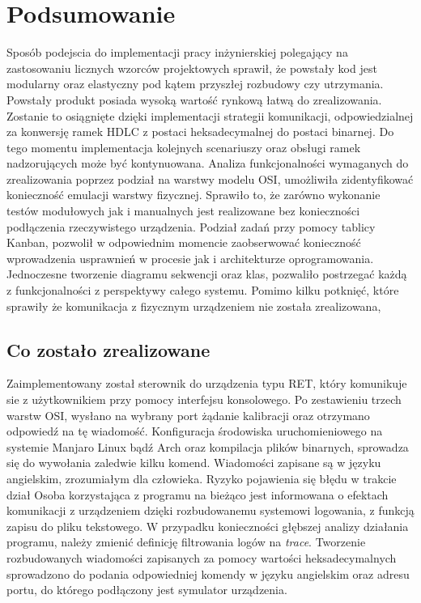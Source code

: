 \chapter{Podsumowanie}
    Sposób podejscia do implementacji pracy inżynierskiej polegający na zastosowaniu licznych wzorców projektowych sprawił, że powstały kod
    jest modularny oraz elastyczny pod kątem przyszłej rozbudowy czy utrzymania. Powstały produkt posiada wysoką wartość rynkową 
    łatwą do zrealizowania. Zostanie to osiągnięte dzięki implementacji strategii komunikacji, odpowiedzialnej za konwersję ramek HDLC z postaci heksadecymalnej
    do postaci binarnej. Do tego momentu implementacja kolejnych scenariuszy oraz obsługi ramek nadzorujących może być kontynuowana.
    Analiza funkcjonalności wymaganych do zrealizowania poprzez podział na warstwy modelu OSI, umożliwiła zidentyfikować konieczność emulacji warstwy fizycznej. 
    Sprawiło to, że zarówno wykonanie testów modułowych jak i manualnych jest realizowane bez konieczności podłączenia rzeczywistego urządzenia. 
    Podział zadań przy pomocy tablicy Kanban, pozwolił w odpowiednim momencie zaobserwować konieczność wprowadzenia usprawnień 
    w procesie jak i architekturze oprogramowania. Jednoczesne tworzenie diagramu sekwencji oraz klas, pozwaliło postrzegać każdą z funkcjonalności z perspektywy całego systemu.
    Pomimo kilku potknięć, które sprawiły że komunikacja z fizycznym urządzeniem nie została zrealizowana, 


    \section{Co zostało zrealizowane}
    Zaimplementowany został sterownik do urządzenia typu RET, który komunikuje sie z użytkownikiem przy pomocy interfejsu konsolowego. Po zestawieniu trzech 
    warstw OSI, wysłano na wybrany port żądanie kalibracji oraz otrzymano odpowiedź na tę wiadomość. Konfiguracja środowiska uruchomieniowego 
    na systemie Manjaro Linux bądź Arch oraz kompilacja plików binarnych, sprowadza się do wywołania zaledwie kilku komend. 
    Wiadomości zapisane są w języku angielskim, zrozumiałym dla człowieka. Ryzyko pojawienia się błędu w trakcie dział
    Osoba korzystająca z programu na bieżąco jest informowana o efektach komunikacji z urządzeniem dzięki rozbudowanemu systemowi logowania, 
    z funkcją zapisu do pliku tekstowego. W przypadku konieczności głębszej analizy działania programu, 
    należy zmienić definicję filtrowania logów na \textit{trace}.
    Tworzenie rozbudowanych wiadomości zapisanych za pomocy wartości heksadecymalnych sprowadzono do podania odpowiedniej komendy
    w języku angielskim oraz adresu portu, do którego podłączony jest symulator urządzenia. 


